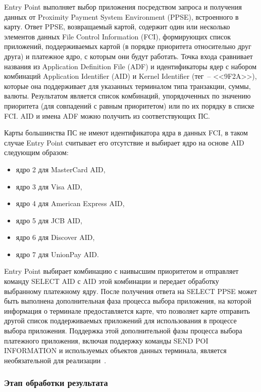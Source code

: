 Entry Point выполняет выбор приложения посредством запроса и получения данных от Proximity Payment System Environment (PPSE), встроенного в карту.
Ответ PPSE, возвращаемый картой, содержит один или несколько элементов данных File Control Information (FCI), формирующих список приложений, поддерживаемых картой (в порядке приоритета относительно друг друга) и платежное ядро, с которым они будут работать.
Точка входа сравнивает названия из Application Definition File (ADF) и идентификаторы ядер с набором комбинаций Application Identifier (AID) и Kernel Identifier (тег~-- <<9F2A>>), которые она поддерживает для указанных терминалом типа транзакции, суммы, валюты.
Результатом является список комбинаций, упорядоченных по значению приоритета (для совпадений с равным приоритетом) или по их порядку в списке FCI.
AID и имена ADF можно получить из соответствующих ПС.

Карты большинства ПС не имеют идентификатора ядра в данных FCI, в таком случае Entry Point считывает его отсутствие и выбирает ядро на основе AID следующим образом:
\begin{itemize}
    \item ядро 2 для MasterCard AID,
    \item ядро 3 для Visa AID,
    \item ядро 4 для American Express AID,
    \item ядро 5 для JCB AID,
    \item ядро 6 для Discover AID,
    \item ядро 7 для UnionPay AID.
\end{itemize}

Entry Point выбирает комбинацию с наивысшим приоритетом и отправляет команду SELECT AID с AID этой комбинации и передает обработку выбранному платежному ядру.
После получения ответа на SELECT PPSE может быть выполнена дополнительная фаза процесса выбора приложения, на которой информация о терминале предоставляется карте, что позволяет карте отправить другой список поддерживаемых приложений для использования в процессе выбора приложения.
Поддержка этой дополнительной фазы процесса выбора платежного приложения, включая поддержку команды SEND POI INFORMATION и используемых объектов данных терминала, является необязательной для реализации~\cite{emv_book_B}.

\subsubsection{Этап обработки результата}
\label{subsubsec:outcome_processing}

